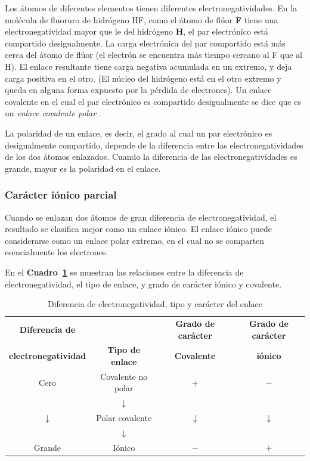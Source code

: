 Los \'atomos de diferentes elementos tienen diferentes electronegatividades. En la
mol\'ecula de fluoruro de hidr\'ogeno HF,  como el \'atomo de fl\'uor \textbf{F} tiene una
electronegatividad mayor que le del hidr\'ogeno \textbf{H}, el par electr\'onico est\'a
compartido desigualmente. La carga electr\'onica del par compartido est\'a m\'as
cerca del \'atomo de fl\'uor (el electr\'on se encuentra m\'as tiempo cercano al F que
al H). El enlace resultante tiene carga negativa acumulada en un extremo, y deja carga
positiva en el otro. (El n\'ucleo del hidr\'ogeno est\'a en el otro extremo y queda
en alguna forma expuesto por la p\'erdida de electrones). Un enlace covalente en el
cual el par electr\'onico es compartido desigualmente se dice que es un
\textit{enlace covalente polar} .

La \gls{polaridad} de un enlace, es decir, el grado al cual un par electr\'onico es desigualmente compartido, depende de la diferencia entre las
electrone\-gatividades de los dos \'atomos enlazados. Cuando la diferencia de las elec\-tro\-ne\-gatividades es grande, mayor es la polaridad en el enlace.

\subsubsection{Car\'acter i\'onico parcial}

 Cuando se enlazan dos \'atomos de gran diferencia de electronegatividad, el resultado se clasifica mejor como un enlace i\'onico. El enlace i\'onico puede considerarse como un enlace polar extremo, en el cual no se comparten esencialmente los electrones.

En el \textbf{Cuadro~\ref{enlace}} se muestran las relaciones entre la diferencia de electronegatividad, el tipo de enlace, y grado de car\'acter i\'onico y covalente.
\begin{table}[thb]
\caption[Electronegatividades y enlaces]{Diferencia de electronegatividad, tipo y
car\'acter del enlace}
\label{enlace}
{\small \begin{tabular}{cccc}\hline
\textbf{Diferencia de}&&\textbf{Grado de car\'acter}&\textbf{Grado de car\'acter}\\
\textbf{electronegatividad}&\textbf{Tipo de enlace}&\textbf{Covalente}& 
\textbf{i\'onico}\\ \hline

Cero &Covalente no polar&$+$ & $-$ \\
   & $\downarrow$ &\\
 $\downarrow$ &Polar covalente&  $\downarrow$ & $\downarrow$ \\
  &  $\downarrow$ & \\
Grande & I\'onico & $-$ & $+$ \\ \hline
\end{tabular}}
\end{table}
